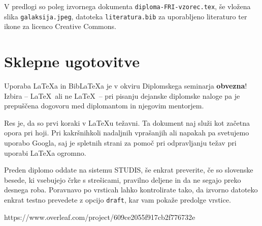 \documentclass[a4paper,12pt,openright]{book}
\newcommand{\BibLaTeX}{{\sc Bib}\LaTeX}
\begin{document}
V predlogi so poleg izvornega  dokumenta \texttt{diploma-FRI-vzorec.tex}, še vložena slika \texttt{galaksija.jpeg}, datoteka \texttt{literatura.bib} za uporabljeno literaturo  ter
ikone za licenco Creative Commons.


\chapter{Sklepne ugotovitve}

Uporaba \LaTeX{a} in \BibLaTeX{a} je v okviru Diplomskega seminarja \textbf{obvezna}!
Izbira -- \LaTeX\ ali ne \LaTeX\ -- pri pisanju dejanske diplomske naloge pa je pre\-pu\-šče\-na dogovoru med diplomantom in njegovim mentorjem.

Res je, da so prvi koraki v \LaTeX{}u težavni. 
Ta dokument naj služi kot začetna opora pri hoji.
Pri kakršnihkoli nadaljnih vprašanjih ali napakah pa svetujemo uporabo Googla, saj je spletnih strani za pomoč pri odpravljanju težav pri uporabi \LaTeX{}a ogromno.

Preden diplomo oddate na sistemu STUDIS, še enkrat preverite, če so slovenske besede, ki vsebujejo črke s strešicami,  pravilno deljene in da ne segajo preko desnega roba.
Poravnavo po vrsticah lahko kontrolirate tako, da izvorno datoteko enkrat testno prevedete z opcijo \texttt{draft}, kar vam pokaže  predolge vrstice.






\printbibliography[heading=bibintoc,type=article,title={Članki v revijah}]
https://www.overleaf.com/project/609ce2055f917cb2f776732e
\printbibliography[heading=bibintoc,type=inproceedings,title={Članki v zbornikih}]

\printbibliography[heading=bibintoc,type=incollection,title={Poglavja v knjigah}]

\printbibliography[heading=bibintoc,title={Celotna literatura}]
\end{document}
